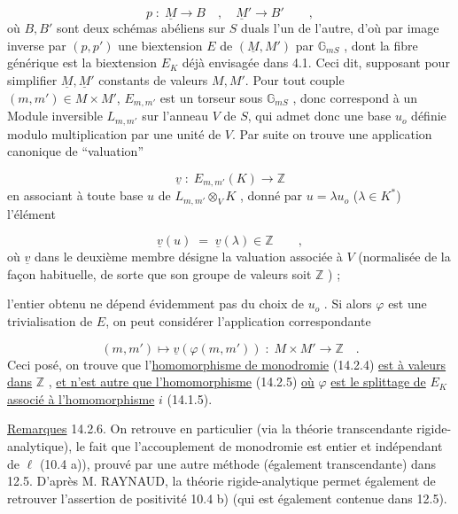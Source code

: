 \begin{equation*}
p \;:\; \underline{M} \longrightarrow B \quad , \quad \underline{M}' \longrightarrow B' \qquad ,
\end{equation*}
où $B,B'$ sont deux schémas abéliens sur $S$ duals l'un de l'autre, d'où par image inverse par $(p,p')$ une biextension $E$ de $(\underline{M},M')$ par $\mathbb{G}_{mS}$ , dont la fibre générique est la biextension $E_K$ déjà envisagée dans 4.1. Ceci dit, supposant pour simplifier $\underline{M},\underline{M}'$ constants de valeurs $M,M'$. Pour tout couple $(m,m') \in M \times M'$, $E_{m,m'}$ est un torseur sous $\mathbb{G}_{mS}$ , donc correspond à un Module inversible $L_{m,m'}$ sur l'anneau $V$ de $S$, qui admet donc une base $u_o$ définie modulo multiplication par une unité de $V$. Par suite on trouve une application canonique de ``valuation''

\begin{equation*}
\underline{v} \;:\; E_{m,m'}(K) \longrightarrow \mathbb{Z}
\end{equation*}
en associant à toute base $u$ de $L_{m,m'} \otimes_V K$ , donné par $u = \lambda u_o$ ($\lambda \in K^*$) l'élément

\begin{equation*}
\underline{v}(u) \;=\; \underline{v}(\lambda) \in \mathbb{Z} \qquad ,
\end{equation*}
où $\underline{v}$ dans le deuxième membre désigne la valuation associée à $V$ (normalisée de la façon habituelle, de sorte que son groupe de valeurs soit $\mathbb{Z}$ ) ;



l'entier obtenu ne dépend évidemment pas du choix de $u_o$ . Si alors $\varphi$ est une trivialisation de $E$, on peut considérer l'application correspondante

\begin{equation}\tag{14.2.5}
(m,m') \longmapsto \underline{v}(\varphi(m,m')) \; : \; M \times M' \longrightarrow \mathbb{Z} \quad .
\end{equation}
Ceci posé, on trouve que l'\underline{homomorphisme de monodromie} (14.2.4) \underline{est à valeurs dans} $\mathbb{Z}$ , \underline{et n'est autre que l'homomorphisme} (14.2.5) \underline{où} $\varphi$ \underline{est le splittage de} $E_K$ \underline{associé à l'homomorphisme} $i$ (14.1.5).

\underline{Remarques} 14.2.6. On retrouve en particulier (via la théorie transcendante rigide-analytique), le fait que l'accouplement de monodromie est entier et indépendant de $\ell$ (10.4 a)), prouvé par une autre méthode (également transcendante) dans 12.5. D'après M. RAYNAUD, la théorie rigide-analytique permet également de retrouver l'assertion de positivité 10.4 b) (qui est également contenue dans 12.5).

